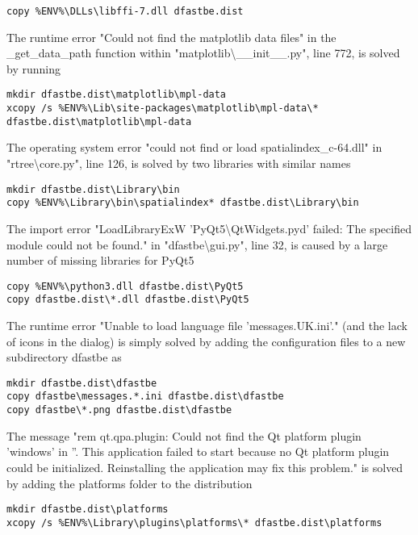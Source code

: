 \begin{Verbatim}
copy %ENV%\DLLs\libffi-7.dll dfastbe.dist
\end{Verbatim}

The runtime error "Could not find the matplotlib data files" in the \_get\_data\_path function within "matplotlib\textbackslash{}\_\_init\_\_.py", line 772, is solved by running

\begin{Verbatim}
mkdir dfastbe.dist\matplotlib\mpl-data
xcopy /s %ENV%\Lib\site-packages\matplotlib\mpl-data\* dfastbe.dist\matplotlib\mpl-data
\end{Verbatim}

The operating system error "could not find or load spatialindex\_c-64.dll" in "rtree\textbackslash{}core.py", line 126, is solved by two libraries with similar names

\begin{Verbatim}
mkdir dfastbe.dist\Library\bin
copy %ENV%\Library\bin\spatialindex* dfastbe.dist\Library\bin
\end{Verbatim}

The import error "LoadLibraryExW 'PyQt5\textbackslash{}QtWidgets.pyd' failed: The specified module could not be found." in "dfastbe\textbackslash{}gui.py", line 32, is caused by a large number of missing libraries for PyQt5

\begin{Verbatim}
copy %ENV%\python3.dll dfastbe.dist\PyQt5
copy dfastbe.dist\*.dll dfastbe.dist\PyQt5
\end{Verbatim}

The runtime error "Unable to load language file 'messages.UK.ini'." (and the lack of icons in the dialog) is simply solved by adding the configuration files to a new subdirectory dfastbe as

\begin{Verbatim}
mkdir dfastbe.dist\dfastbe
copy dfastbe\messages.*.ini dfastbe.dist\dfastbe
copy dfastbe\*.png dfastbe.dist\dfastbe
\end{Verbatim}

The message "rem qt.qpa.plugin: Could not find the Qt platform plugin 'windows' in ''. This application failed to start because no Qt platform plugin could be initialized. Reinstalling the application may fix this problem." is solved by adding the platforms folder to the distribution

\begin{Verbatim}
mkdir dfastbe.dist\platforms
xcopy /s %ENV%\Library\plugins\platforms\* dfastbe.dist\platforms
\end{Verbatim}

